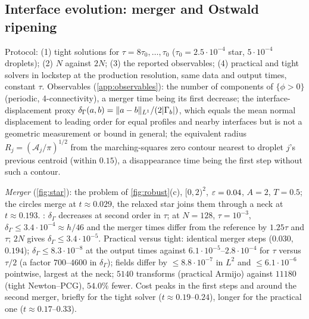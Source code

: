 \subsection{Interface evolution: merger and Ostwald ripening}\label{sec:num-interface}
Protocol: (1) tight solutions for $\tau=8\tau_0,\dots,\tau_0$ ($\tau_0=2.5\cdot10^{-4}$ star, $5\cdot10^{-4}$ droplets); (2) $N$ against $2N$; (3) the reported observables; (4) practical and tight solvers in lockstep at the production resolution, same data and output times, constant $\tau$. Observables (\cref{app:observables}): the number of components of $\{\phi>0\}$ (periodic, 4-connectivity), a merger time being its first decrease; the interface-displacement proxy $\delta_\Gamma(a,b)=\lVert a-b\rVert_{L^1}/(2|\Gamma_b|)$, which equals the mean normal displacement to leading order for equal profiles and nearby interfaces but is not a geometric measurement or bound in general; the equivalent radius $R_j=(\mathcal A_j/\pi)^{1/2}$ from the marching-squares zero contour nearest to droplet $j$'s previous centroid (within $0.15$), a disappearance time being the first step without such a contour.

\begin{table}[tbp]
\caption{Resolution study (tight solver). Star: $\delta_\Gamma$ against $N=128$, $\tau=2.5\cdot10^{-4}$ at $t=0.1,0.25,0.5$, and merger times. Droplets: largest difference of the radii at $t=0.15,1,2$ against the run in column~3, and disappearance times $t_1,t_2$. Production resolutions~$^\ast$.}\label{tab:resolution}
\centering\scriptsize\setlength{\tabcolsep}{4pt}

\end{table}

\emph{Merger} (\cref{fig:star}): the problem of \cref{fig:robust}(c), $[0,2)^2$, $\varepsilon=0.04$, $A=2$, $T=0.5$; the circles merge at $t\approx0.029$, the relaxed star joins them through a neck at $t\approx0.193$. : $\delta_\Gamma$ decreases at second order in $\tau$; at $N=128$, $\tau=10^{-3}$, $\delta_\Gamma\le3.4\cdot10^{-4}\approx h/46$ and the merger times differ from the reference by $1.25\tau$ and $\tau$; $2N$ gives $\delta_\Gamma\le3.4\cdot10^{-5}$. Practical versus tight: identical merger steps ($0.030$, $0.194$); $\delta_\Gamma\le8.3\cdot10^{-8}$ at the output times against $6.1\cdot10^{-5}$--$2.8\cdot10^{-4}$ for $\tau$ versus $\tau/2$ (a factor $700$--$4600$ in $\delta_\Gamma$); fields differ by $\le8.8\cdot10^{-7}$ in $L^2$ and $\le6.1\cdot10^{-6}$ pointwise, largest at the neck; $5140$ transforms (practical Armijo) against $11180$ (tight Newton--PCG), $54.0\%$ fewer. Cost peaks in the first steps and around the second merger, briefly for the tight solver ($t\approx0.19$--$0.24$), longer for the practical one ($t\approx0.17$--$0.33$).

